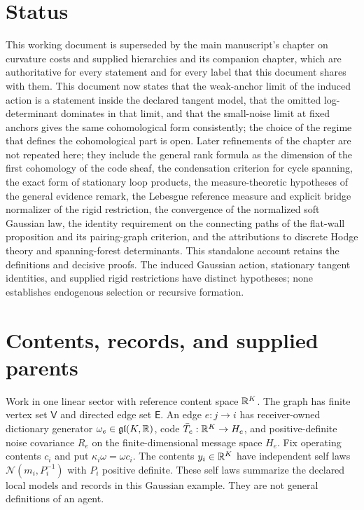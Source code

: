 \documentclass[11pt,letterpaper]{report}
\begin{document}
\hypersetup{pageanchor=false}
\hypersetup{pageanchor=true}
\chapter*{Status}
This working document is superseded by the main manuscript's chapter on curvature costs and supplied hierarchies and its companion chapter, which are authoritative for every statement and for every label that this document shares with them. This document now states that the weak-anchor limit of the induced action is a statement inside the declared tangent model, that the omitted log-determinant dominates in that limit, and that the small-noise limit at fixed anchors gives the same cohomological form consistently; the choice of the regime that defines the cohomological part is open. Later refinements of the chapter are not repeated here; they include the general rank formula as the dimension of the first cohomology of the code sheaf, the condensation criterion for cycle spanning, the exact form of stationary loop products, the measure-theoretic hypotheses of the general evidence remark, the Lebesgue reference measure and explicit bridge normalizer of the rigid restriction, the convergence of the normalized soft Gaussian law, the identity requirement on the connecting paths of the flat-wall proposition and its pairing-graph criterion, and the attributions to discrete Hodge theory and spanning-forest determinants. This standalone account retains the definitions and decisive proofs. The induced Gaussian action, stationary tangent identities, and supplied rigid restrictions have distinct hypotheses; none establishes endogenous selection or recursive formation.
\begingroup
\small
\tableofcontents
\endgroup
\clearpage
{}

\chapter{Contents, records, and supplied parents}
\label{it3:ch-setting}

Work in one linear sector with reference content space $\mathbb R^K$. The graph has finite vertex set $\mathsf V$ and directed edge set $\mathsf E$. An edge $e:j\to i$ has receiver-owned dictionary generator $\omega_e\in\mathfrak{gl}(K,\mathbb R)$, code $\bar T_e:\mathbb R^K\to H_e$, and positive-definite noise covariance $R_e$ on the finite-dimensional message space $H_e$. Fix operating contents $c_i$ and put $\kappa_i\omega=\omega c_i$. The contents $y_i\in\mathbb R^K$ have independent self laws $\mathcal N(m_i,P_i^{-1})$ with $P_i$ positive definite. These self laws summarize the declared local models and records in this Gaussian example. They are not general definitions of an agent.
\end{document}
